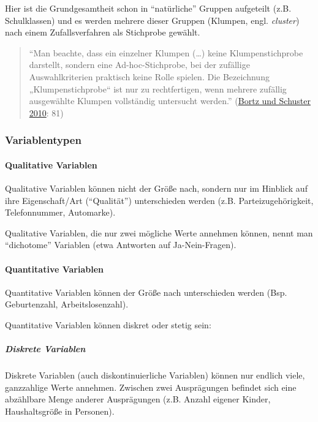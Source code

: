 \documentclass[
  ngerman,
]{article}
\begin{document}
Hier ist die Grundgesamtheit schon in ``natürliche'' Gruppen aufgeteilt (z.B. Schulklassen) und es werden mehrere dieser Gruppen (Klumpen, engl. \emph{cluster}) nach einem Zufallsverfahren als Stichprobe gewählt.

\begin{quote}
``Man beachte, dass ein einzelner Klumpen (\ldots) keine Klumpenstichprobe darstellt, sondern eine Ad-hoc-Stichprobe, bei der zufällige Auswahlkriterien praktisch keine Rolle spielen. Die Bezeichnung „Klumpenstichprobe`` ist nur zu rechtfertigen, wenn mehrere zufällig ausgewählte Klumpen vollständig untersucht werden.'' (\protect\hyperlink{ref-bortz}{Bortz und Schuster 2010}: 81)
\end{quote}

\hypertarget{variablentypen}{%
\subsubsection{Variablentypen}\label{variablentypen}}

\hypertarget{qualitative-variablen}{%
\paragraph{Qualitative Variablen}\label{qualitative-variablen}}

Qualitative Variablen können nicht der Größe nach, sondern nur im Hinblick auf ihre Eigenschaft/Art (``Qualität'') unterschieden werden (z.B. Parteizugehörigkeit, Telefonnummer, Automarke).

Qualitative Variablen, die nur zwei mögliche Werte annehmen können, nennt man ``dichotome'' Variablen (etwa Antworten auf Ja-Nein-Fragen).

\hypertarget{quantitative-variablen}{%
\paragraph{Quantitative Variablen}\label{quantitative-variablen}}

Quantitative Variablen können der Größe nach unterschieden werden (Bsp. Geburtenzahl, Arbeitslosenzahl).

Quantitative Variablen können diskret oder stetig sein:

\hypertarget{diskrete-variablen}{%
\subparagraph{Diskrete Variablen}\label{diskrete-variablen}}

Diskrete Variablen (auch diskontinuierliche Variablen) können nur endlich viele, ganzzahlige Werte annehmen. Zwischen zwei Ausprägungen befindet sich eine abzählbare Menge anderer Ausprägungen (z.B. Anzahl eigener Kinder, Haushaltsgröße in Personen).
\end{document}
